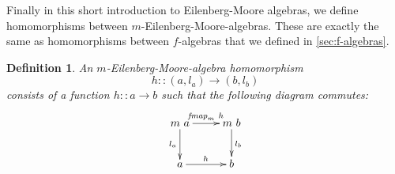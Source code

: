 \documentclass{jfp1}
\newtheorem{definition}{Definition}
\begin{document}

Finally in this short introduction to Eilenberg-Moore algebras, we
define homomorphisms between $m$-Eilenberg-Moore-algebras. These are
exactly the same as homomorphisms between $f$-algebras that we defined
in \autoref{sec:f-algebras}.

\begin{definition}
  An \emph{$m$-Eilenberg-Moore-algebra homomorphism}
  \begin{displaymath}
    h :: (a, l_a) \to (b, l_b)
  \end{displaymath}
  consists of a function $h :: a \to b$ such that the following
  diagram commutes:
  \begin{equation}
    \label{eq:em-alg-homomorphism}
    \xymatrix{
      {m~a} \ar[r]^{\mathit{fmap}_m~h} \ar[d]_{l_a}
      &
      {m~b} \ar[d]^{l_b}
      \\
      {a} \ar[r]^h
      &
      {b}
    }
  \end{equation}
\end{definition}
\end{document}
